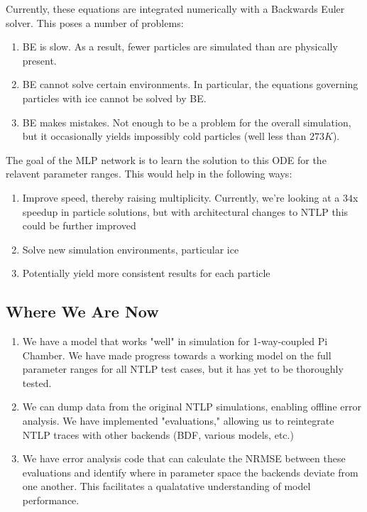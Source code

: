 \documentclass{article}
\begin{document}
Currently, these equations are integrated numerically with a Backwards Euler solver. This poses a number of problems:
\begin{enumerate}
	\item BE is slow. As a result, fewer particles are simulated than are physically present.
	\item BE cannot solve certain environments. In particular, the equations governing particles with ice cannot be solved by BE.
	\item BE makes mistakes. Not enough to be a problem for the overall simulation, but it occasionally yields impossibly cold particles (well less than $273K$).
\end{enumerate}
The goal of the MLP network is to learn the solution to this ODE for the relavent parameter ranges. This would help in the following ways:
\begin{enumerate}
	\item Improve speed, thereby raising multiplicity. Currently, we're looking at a $34$x speedup in particle solutions, but with architectural changes to NTLP this could be further improved
	\item Solve new simulation environments, particular ice
	\item Potentially yield more consistent results for each particle
\end{enumerate}
\subsection{Where We Are Now}
\begin{enumerate}
	\item We have a model that works "well" in simulation for 1-way-coupled Pi Chamber. We have made progress towards a working model on the full parameter ranges for all NTLP test cases, but it has yet to be thoroughly tested.
	\item We can dump data from the original NTLP simulations, enabling offline error analysis. We have implemented "evaluations," allowing us to reintegrate NTLP traces with other backends (BDF, various models, etc.)
	\item We have error analysis code that can calculate the NRMSE between these evaluations and identify where in parameter space the backends deviate from one another. This facilitates a qualatative understanding of model performance.
\end{enumerate}
\end{document}
